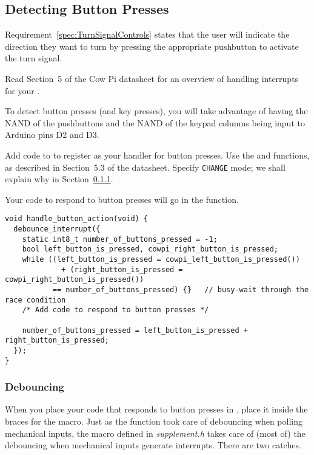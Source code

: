 \subsection{Detecting Button Presses}

Requirement~\ref{spec:TurnSignalControls} states that the user will indicate the direction they want to turn by pressing the appropriate pushbutton to activate the turn signal.

Read Section~5 of the Cow Pi datasheet for an overview of handling interrupts for your \developmentboard.

To detect button presses (and key presses), you will take advantage of having the NAND of the pushbuttons and the NAND of the keypad columns being input to Arduino pins D2 and D3.

Add code to  to register  as your handler for button presses.
Use the  and  functions, as described in Section~5.3 of the datasheet.
Specify \lstinline{CHANGE} mode;
we shall explain why in Section~\ref{subsubsec:debouncing}.

Your code to respond to button presses will go in the  function.

\begin{lstlisting}[basicstyle=\small]
void handle_button_action(void) {
  debounce_interrupt({
    static int8_t number_of_buttons_pressed = -1;
    bool left_button_is_pressed, cowpi_right_button_is_pressed;
    while ((left_button_is_pressed = cowpi_left_button_is_pressed())
             + (right_button_is_pressed = cowpi_right_button_is_pressed())
           == number_of_buttons_pressed) {}   // busy-wait through the race condition
    /* Add code to respond to button presses */

    number_of_buttons_pressed = left_button_is_pressed + right_button_is_pressed;
  });
}
\end{lstlisting}

\subsubsection{Debouncing} \label{subsubsec:debouncing}

When you place your code that responds to button presses in , place it inside the braces for the  macro.
Just as the  function took care of debouncing when polling mechanical inputs, the  macro defined in \textit{supplement.h} takes care of (most of) the debouncing when mechanical inputs generate interrupts.
There are two catches.

